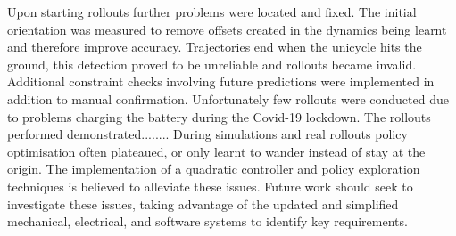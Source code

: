 \documentclass[twoside,twocolumn,12pt]{article}
\begin{document}
\newline
Upon starting rollouts further problems were located and fixed. The initial orientation was measured to remove offsets created in the dynamics being learnt and therefore improve accuracy. Trajectories end when the unicycle hits the ground, this detection proved to be unreliable and rollouts became invalid. Additional constraint checks involving future predictions were implemented in addition to manual confirmation.
\newline
Unfortunately few rollouts were conducted due to problems charging the battery during the Covid-19 lockdown. The rollouts performed demonstrated........
\newline
During simulations and real rollouts policy optimisation often plateaued, or only learnt to wander instead of stay at the origin. The implementation of a quadratic controller and policy exploration techniques is believed to alleviate these issues.
\newline
Future work should seek to investigate these issues, taking advantage of the updated and simplified mechanical, electrical, and software systems to identify key requirements. 

\onecolumn

\tableofcontents

\twocolumn
\end{document}
